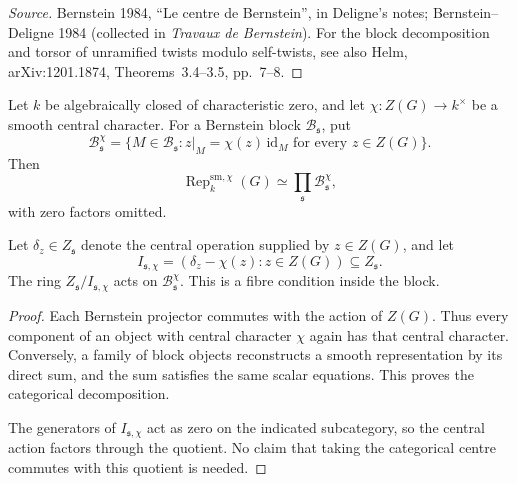 \begin{proof}[Source]
Bernstein 1984, ``Le centre de Bernstein'', in Deligne's notes;
Bernstein--Deligne 1984 (collected in \emph{Travaux de Bernstein}).
For the block decomposition and torsor of unramified twists modulo
self-twists, see also Helm, arXiv:1201.1874, Theorems~3.4--3.5,
pp.~7--8.
\end{proof}

\begin{proposition}
\label{v4-arith:w5-f:F1a3-AB:prop:block-chi-compat}
\ClaimStatusProvedHere
Let \(k\) be algebraically closed of characteristic
zero, and let \(\chi:Z(G)\to k^\times\) be a smooth
central character. For a Bernstein block
\(\mathcal B_{\mathfrak s}\), put
\[
 \mathcal B_{\mathfrak s}^{\chi}
 =\{M\in\mathcal B_{\mathfrak s}:
        z|_M=\chi(z)\,\mathrm{id}_M
        \text{ for every }z\in Z(G)\}.
\]
Then
\[
 \operatorname{Rep}^{\mathrm{sm},\chi}_k(G)
   \simeq \prod_{\mathfrak s}
                     \mathcal B_{\mathfrak s}^{\chi},
\]
with zero factors omitted.

Let \(\delta_z\in Z_{\mathfrak s}\) denote the
central operation supplied by \(z\in Z(G)\), and
let
\[
 I_{\mathfrak s,\chi}
   =(\delta_z-\chi(z):z\in Z(G))
       \subseteq Z_{\mathfrak s}.
\]
The ring \(Z_{\mathfrak s}/I_{\mathfrak s,\chi}\)
acts on \(\mathcal B_{\mathfrak s}^{\chi}\).
This is a fibre condition inside the block.
\end{proposition}

\begin{proof}
Each Bernstein projector commutes with the action
of \(Z(G)\). Thus every component of an object
with central character \(\chi\) again has that
central character. Conversely, a family of block objects reconstructs a smooth
representation by its direct sum, and the sum satisfies the same
scalar equations. This proves the
categorical decomposition.

The generators of \(I_{\mathfrak s,\chi}\)
act as zero on the indicated subcategory, so
the central action factors through the quotient.
No claim that taking the categorical centre
commutes with this quotient is needed.
\end{proof}

